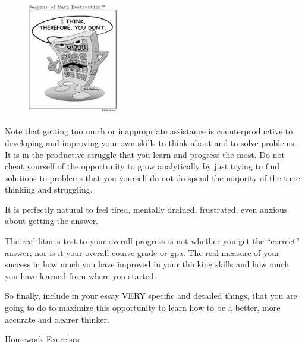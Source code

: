 \documentclass{article}
\begin{document}
\begin{figure}[h!]
  \centering
  \includegraphics[width=0.35\textwidth]{talking-calculator.jpg}
\end{figure}

Note that getting too much or inappropriate assistance is counterproductive to developing and improving your own skills to think about and to solve problems.  It is in the productive struggle that you learn and progress the most.  Do not cheat yourself of the opportunity to grow analytically by just trying to find solutions to problems that you yourself do not do spend the majority of the time thinking and struggling.

It is perfectly natural to feel tired, mentally drained, frustrated, even anxious about getting the answer.

The real litmus test to your overall progress is not whether you get the “correct” answer; nor is it your overall course grade or gpa.   The real measure of your success in how much you have improved in your thinking skills and how much you have learned from where you started.


So finally, include in your essay VERY specific and detailed things, that you are going to do to maximize this opportunity to learn how to be a better, more accurate and clearer thinker.

\clearpage

\begin{center}
  Homework Exercises
\end{center}
\end{document}
